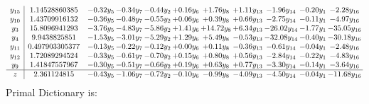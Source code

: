 \documentclass[9pt]{article}
\begin{document}
\[\begin{array}{c| c c@{\hskip 2pt} c@{\hskip 2pt} c@{\hskip 2pt} c@{\hskip 2pt} c@{\hskip 2pt} c@{\hskip 2pt} c@{\hskip 2pt} c@{\hskip 2pt} c@{\hskip 2pt} }
 y_{15}   &  1.14528860385 & -0.32 y_{5} & -0.34 y_{7} & -0.44 y_{2} & +  0.16 y_{6} & +  1.76 y_{8} & +  1.11 y_{13} & -1.96 y_{14} & -0.20 y_{1} & -2.28 y_{16}\\
 y_{10}   &  1.43709916132 & -0.36 y_{5} & -0.48 y_{7} & -0.55 y_{2} & +  0.06 y_{6} & +  0.39 y_{8} & +  0.66 y_{13} & -2.75 y_{14} & -0.11 y_{1} & -4.97 y_{16}\\
 y_{3}   &  15.8096941293 & -3.76 y_{5} & -4.83 y_{7} & -5.86 y_{2} & +  1.41 y_{6} & + 14.72 y_{8} & +  6.34 y_{13} & -26.02 y_{14} & -1.77 y_{1} & -35.05 y_{16}\\
 y_{4}   &  9.9438825851 & -1.53 y_{5} & -3.01 y_{7} & -5.29 y_{2} & +  1.29 y_{6} & +  5.49 y_{8} & -0.53 y_{13} & -32.08 y_{14} & -0.40 y_{1} & -30.18 y_{16}\\
 y_{11}   &  0.497903305377 & -0.13 y_{5} & -0.22 y_{7} & -0.12 y_{2} & +  0.00 y_{6} & +  0.11 y_{8} & -0.36 y_{13} & -0.61 y_{14} & -0.04 y_{1} & -2.48 y_{16}\\
 y_{12}   &  1.72089294524 & -0.33 y_{5} & -0.61 y_{7} & -0.70 y_{2} & +  0.15 y_{6} & +  0.80 y_{8} & +  0.56 y_{13} & -2.84 y_{14} & -0.22 y_{1} & -4.83 y_{16}\\
 y_{9}   &  1.41847557967 & -0.30 y_{5} & -0.51 y_{7} & -0.66 y_{2} & +  0.19 y_{6} & +  0.63 y_{8} & +  0.77 y_{13} & -3.30 y_{14} & -0.14 y_{1} & -3.64 y_{16}\\
\hline
z    &  2.361124815 & -0.43 y_{5} & -1.06 y_{7} & -0.72 y_{2} & -0.10 y_{6} & -0.99 y_{8} & -4.09 y_{13} & -4.50 y_{14} & -0.04 y_{1} & -11.68 y_{16}\\
\end{array}\]
Primal Dictionary is:
\end{document}
